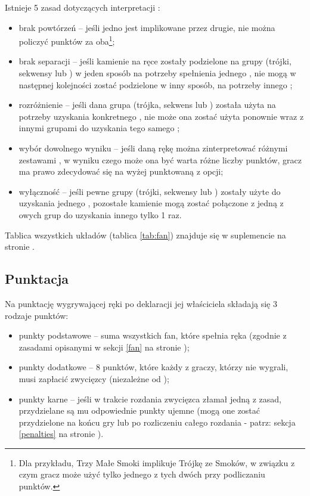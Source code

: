 Istnieje 5 zasad dotyczących interpretacji :
\begin{itemize}
  \item brak powtórzeń -- jeśli jedno  jest implikowane przez
  drugie, nie można policzyć punktów za oba\footnote{Dla przykładu,
   Trzy Małe Smoki implikuje Trójkę ze Smoków, w związku z
  czym gracz może użyć tylko jednego z tych dwóch  przy podliczaniu
  punktów.};
  \item brak separacji -- jeśli kamienie na ręce zostały podzielone na grupy
  (trójki, sekwensy lub ) w jeden sposób na potrzeby spełnienia
  jednego , nie mogą w następnej kolejności zostać podzielone w inny
  sposób, na potrzeby innego ;
  \item rozróżnienie -- jeśli dana grupa (trójka, sekwens lub )
  została użyta na potrzeby uzyskania konkretnego , nie może ona
  zostać użyta ponownie wraz z innymi grupami do uzyskania tego samego
  ;
  \item wybór dowolnego wyniku -- jeśli daną rękę można zinterpretować różnymi
  zestawami , w wyniku czego może ona być warta różne liczby
  punktów, gracz ma prawo zdecydować się na wyżej punktowaną z opcji;
  \item wyłączność -- jeśli pewne grupy (trójki, sekwensy lub )
  zostały użyte do uzyskania jednego , pozostałe kamienie mogą
  zostać połączone z jedną z owych grup do uzyskania innego  tylko 1
  raz.
\end{itemize}

Tablica wszystkich układów (tablica \ref{tab:fan}) znajduje się w suplemencie na stronie \pageref{tab:fan2}.

\subsection{Punktacja}
\label{punktacja}
Na punktację wygrywającej ręki po deklaracji  jej właściciela
składają się 3 rodzaje punktów: 
\begin{itemize}
  \item punkty podstawowe -- suma wszystkich fan, które spełnia ręka (zgodnie z
  zasadami opisanymi w sekcji \ref{fan} na stronie \pageref{fan});
  \item punkty dodatkowe -- 8 punktów, które każdy z graczy, którzy nie wygrali,
  musi zapłacić zwycięzcy (niezależne od );
  \item punkty karne -- jeśli w trakcie rozdania zwycięzca złamał jedną z zasad,
  przydzielane są mu odpowiednie punkty ujemne (mogą one zostać przydzielone na
  końcu gry lub po rozliczeniu całego rozdania - patrz: sekcja
  \ref{penalties} na stronie \pageref{penalties}).
\end{itemize}

